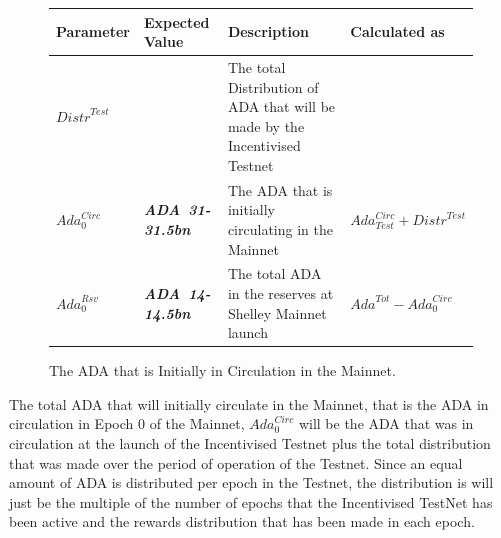 \documentclass[11pt,a4paper,dvipsnames,twosided,final]{article}
\newcommand{\ada}{ADA{}}
\newcommand{\ADA}[1]{\textbf{\emph{\ada~{#1}}}}
\begin{document}
\clearpage
\begin{figure}[h!]
\begin{center}
\begin{tabular}{||l|l|p{6cm}|l||}
  \hline \hline
\textbf{Parameter} & \textbf{Expected Value} & \textbf{Description} & \textbf{Calculated as} \\\hline
${\textit{Distr}}^{Test}$ & & The total Distribution of \ada{} that will be made by the Incentivised Testnet & \\\hline
$\textit{Ada}^{\textit{Circ}}_{0}$ & \ADA{31-31.5bn} & The \ada{} that is initially circulating in the Mainnet & $\textit{Ada}^{\textit{Circ}}_{\textit{Test}} + {\textit{Distr}}^{\textit{Test}}$ \\\hline
$\textit{Ada}^{\textit{Rsv}}_{0}$ & \ADA{14-14.5bn} & The total \ada{} in the reserves at Shelley Mainnet launch & $\textit{Ada}^{Tot} - \textit{Ada}^{\textit{Circ}}_{0}$ \\\hline
\hline
\end{tabular}
\end{center}
\caption{The \ada{} that is Initially in Circulation in the Mainnet.}
\end{figure}

\noindent
The total \ada{} that will initially circulate in the Mainnet, that is the \ada{} in circulation in Epoch 0 of the Mainnet,
$\textit{Ada}^{\textit{Circ}}_{0}$ will be the \ada{} that was in circulation at the launch of the Incentivised
Testnet plus the total distribution that was made over the period of operation of the Testnet.
Since an equal amount of \ada{} is distributed per epoch in
the Testnet,
the distribution is will just be the multiple of the number of epochs that the Incentivised TestNet has
been active and the rewards distribution that has been made in each epoch.
\end{document}
